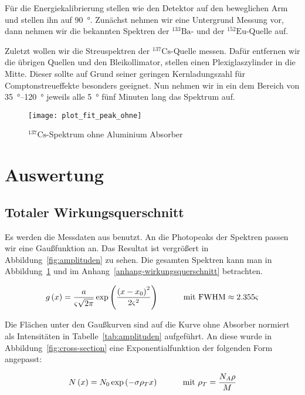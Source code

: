 \documentclass[11pt, ngerman, fleqn, DIV=15, headinclude, BCOR=2cm]{scrreprt}
\newcommand{\plotwidth}{0.8\linewidth}
\begin{document}
Für die Energiekalibrierung stellen wie den Detektor auf den beweglichen Arm
und stellen ihn auf \SI{90}{\degree}. Zunächst nehmen wir eine Untergrund
Messung vor, dann nehmen wir die bekannten Spektren der $^{133}\text{Ba}$- und
der $^{152}\text{Eu}$-Quelle auf.

Zuletzt wollen wir die Streuspektren der $^{137}\text{Cs}$-Quelle messen. Dafür
entfernen wir die übrigen Quellen und den Bleikollimator, stellen einen Plexiglaszylinder 
in die Mitte. Dieser
sollte auf Grund seiner geringen Kernladungszahl für Comptonstreueffekte besonders
geeignet. Nun nehmen wir in ein dem Bereich von \SIrange{35}{120}{\degree}
jeweils alle \SI{5}{\degree} fünf Minuten lang das Spektrum auf.

\begin{figure}[h]
    \centering
    \texttt{[image: plot\_fit\_peak\_ohne]}
    \caption{%
	    $^{137}\text{Cs}$-Spektrum ohne Aluminium Absorber
   }
    \label{fig:plot_fit_peak_ohne}
\end{figure}


\chapter{Auswertung}

\section{Totaler Wirkungsquerschnitt}

Es werden die Messdaten aus \fehlt%
benutzt.
An die Photopeaks der Spektren passen wir eine Gaußfunktion an. Das Resultat
ist vergrößert in Abbildung~\ref{fig:amplituden} zu sehen. Die gesamten
Spektren kann man in Abbildung~\ref{fig:plot_fit_peak_ohne} und im
Anhang~\ref{anhang-wirkungsquerschnitt} betrachten.

\begin{equation}
	g\del x = \frac{a}{\varsigma \sqrt{2 \pi}} \exp\del{\frac{\del
		{x - x_0}^2}{2 \varsigma^2}}
		\quad \quad \quad \text{mit FWHM} \approx 2.355 \varsigma
\end{equation}

Die Flächen unter den Gaußkurven sind auf die Kurve ohne Absorber normiert als
Intensitäten in Tabelle~\ref{tab:amplituden} aufgeführt. An diese wurde in
Abbildung~\ref{fig:cross-section} eine Exponentialfunktion der folgenden Form
angepasst:

\begin{equation}
	N\del x = N_0 \exp\del{-\sigma \rho_T x} \quad \quad \quad \text{mit }
	\rho_T = \frac{N_A \rho}{M}
\end{equation}
\end{document}
